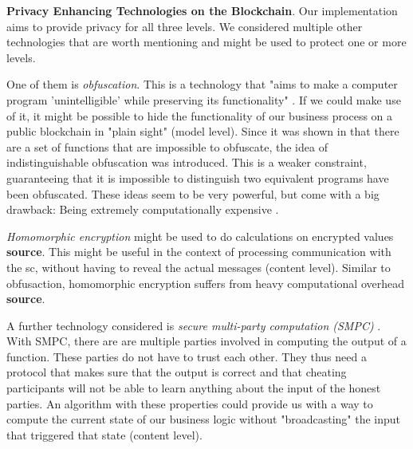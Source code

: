 \documentclass[runningheads]{llncs}
\newcommand{\comment}[1]{}
\begin{document}
\comment{
\begin{itemize}
    \item private blockchain (why is this more private? What kinds are there?)
    \item ring signatures
    \item homomorphic encryption
    \item zero knowledge proofs -> zero cash
    \item partiy.io. Also does secret messages. Has a private contract in the smart contract. We are better, because we can hide content from each other (concept of circles). Do a picture with where you are comparing the architecture (siehe mein colledge block)
\end{itemize}
}
\bigbreak
\textbf{Privacy Enhancing Technologies on the Blockchain}. Our implementation aims to provide privacy for all three levels. We considered multiple other technologies that are worth mentioning and might be used to protect one or more levels. 

One of them is \textit{obfuscation}. This is a technology that "aims to make a computer program 'unintelligible' while preserving its functionality" \cite{garg2016candidate}. If we could make use of it, it might be possible to hide the functionality of our business process on a public blockchain in "plain sight" (model level). Since it was shown in \cite{barak2001possibility,barak2012possibility} that there are a set of functions that are impossible to obfuscate, the idea of indistinguishable obfuscation was introduced. This is a weaker constraint, guaranteeing that it is impossible to distinguish two equivalent programs have been obfuscated. These ideas seem to be very powerful, but come with a big drawback: Being extremely computationally expensive \cite{banescu2015idea}.
\comment{
According to \cite{banescu2015idea}, to even generate an obfuscation of a 2-bit multiplication circuit would take about $10^{27}$ years on a 2,6 GHz CPU.} 


\textit{Homomorphic encryption} might be used to do calculations on encrypted values \textbf{source}. This might be useful in the context of processing communication with the sc, without having to reveal the actual messages (content level). Similar to obfusaction, homomorphic encryption suffers from heavy computational overhead \textbf{source}.


A further technology considered is \textit{secure multi-party computation (SMPC)} \cite{orlandi2011multiparty}. With SMPC, there are are multiple parties involved in computing the output of a function. These parties do not have to trust each other. They thus need a protocol that makes sure that the output is correct and that cheating participants will not be able to learn anything about the input of the honest parties. An algorithm with these properties could provide us with a way to compute the current state of our business logic without "broadcasting" the input that triggered that state (content level). 
\end{document}
